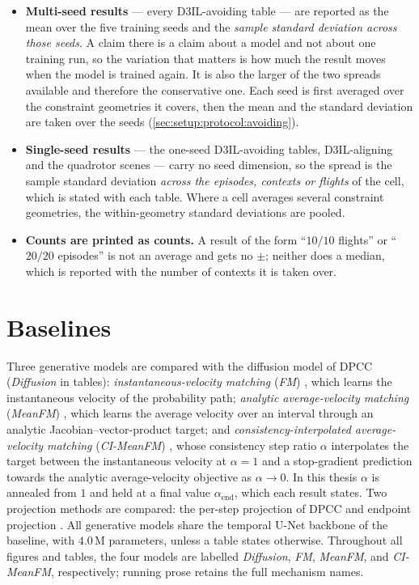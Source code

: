 \begin{itemize}
  \item \textbf{Multi-seed results} --- every D3IL-avoiding table --- are reported as the mean over the
    five training seeds and the \emph{sample standard deviation across those seeds}. A claim there is a
    claim about a model and not about one training run, so the variation that matters is how much the
    result moves when the model is trained again. It is also the larger of the two spreads available and
    therefore the conservative one. Each seed is first averaged over the constraint geometries it covers,
    then the mean and the standard deviation are taken over the seeds
    (\autoref{sec:setup:protocol:avoiding}).
  \item \textbf{Single-seed results} --- the one-seed D3IL-avoiding tables, D3IL-aligning and the
    quadrotor scenes --- carry no seed dimension, so the spread is the sample standard deviation
    \emph{across the episodes, contexts or flights} of the cell, which is stated with each table. Where a
    cell averages several constraint geometries, the within-geometry standard deviations are pooled.
  \item \textbf{Counts are printed as counts.} A result of the form \enquote{$10/10$ flights} or
    \enquote{$20/20$ episodes} is not an average and gets no $\pm$; neither does a median, which is
    reported with the number of contexts it is taken over.
\end{itemize}

\section{Baselines}\label{sec:setup:baselines}

Three generative models are compared with the diffusion model of \ac{DPCC} (\emph{Diffusion} in tables):
\emph{instantaneous-velocity matching} (\emph{FM}) \parencite{lipman2023flow}, which learns the
instantaneous velocity of the probability path; \emph{analytic average-velocity matching}
(\emph{MeanFM}) \parencite{geng2025meanflow}, which learns the average velocity over an interval through
an analytic Jacobian--vector-product target; and \emph{consistency-interpolated average-velocity
matching} (\emph{CI-MeanFM}) \parencite{zhang2025alphaflow}, whose consistency step ratio $\alpha$
interpolates the target between the instantaneous velocity at $\alpha=1$ and a stop-gradient prediction
towards the analytic average-velocity objective as $\alpha\to0$. In this thesis $\alpha$ is annealed from
$1$ and held at a final value
$\alpha_{\mathrm{end}}$, which each result states. Two projection methods are compared: the per-step projection of
\ac{DPCC} and endpoint projection \parencite{li2025hardflow}. All generative models share the temporal
U-Net backbone of the baseline, with $4.0$\,M parameters, unless a table states otherwise. Throughout
all figures and tables, the four models are labelled \emph{Diffusion}, \emph{FM}, \emph{MeanFM}, and
\emph{CI-MeanFM}, respectively; running prose retains the full mechanism names.


